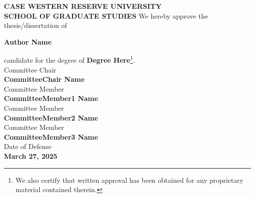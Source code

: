 \documentclass[12pt, oneside]{book}
\begin{document}
\newpage
\begin{center}
    \textbf{\MakeUppercase{Case Western Reserve University}}\\
    \textbf{\MakeUppercase{School of Graduate Studies}}
    \vfill
    We hereby approve the thesis/dissertation of \par
    \textbf{Author Name} \par
    candidate for the degree of \textbf{Degree Here}\footnote{We also certify that written approval has been obtained for any proprietary material contained therein.}.\\
    \vfill
    Committee Chair \\
    \textbf{CommitteeChair Name}\\
    \vfill
    Committee Member \\
    \textbf{CommitteeMember1 Name}\\
    \vfill
    Committee Member \\
    \textbf{CommitteeMember2 Name}\\
    \vfill
    Committee Member \\
    \textbf{CommitteeMember3 Name}\\
    \vfill
    Date of Defense \\
    \textbf{March 27, 2025}
\end{center}


\tableofcontents
\listoffigures
\listoftables









\end{document}
